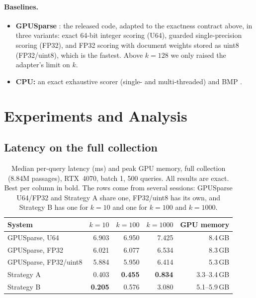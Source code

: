 \documentclass[11pt]{article}
\begin{document}
\paragraph{Baselines.}
\begin{itemize}
\item \textbf{GPUSparse} \cite{gpusparse}: the released code, adapted to the exactness contract above,
  in three variants: exact 64-bit integer scoring (U64), guarded single-precision scoring (FP32), and FP32 scoring
  with document weights stored as uint8 (FP32/uint8), which is the fastest. Above $k=128$ we only raised the
  adapter's limit on $k$.
\item \textbf{CPU:} an exact exhaustive scorer (single- and multi-threaded) and BMP \cite{bmp}.
\end{itemize}

\section{Experiments and Analysis}

\subsection{Latency on the full collection}
\begin{table}[H]
\centering
\caption{Median per-query latency (ms) and peak GPU memory, full collection (8.84M passages),
RTX~4070, batch 1, 500 queries. All results are exact. Best per column in bold. The rows come from several
sessions: GPUSparse U64/FP32 and Strategy A share one, FP32/uint8 has its own, and Strategy B has one for
$k=10$ and one for $k=100$ and $k=1000$.}
\label{tab:main}
\begin{tabular}{lrrrr}
\toprule
System & $k=10$ & $k=100$ & $k=1000$ & GPU memory\\
\midrule
GPUSparse, U64 & 6.903 & 6.950 & 7.425 & 8.4\,GB\\
GPUSparse, FP32 & 6.021 & 6.077 & 6.534 & 8.3\,GB\\
GPUSparse, FP32/uint8 & 5.884 & 5.950 & 6.414 & 5.3\,GB\\
\midrule
Strategy A & 0.403 & \textbf{0.455} & \textbf{0.834} & 3.3--3.4\,GB\\
Strategy B & \textbf{0.205} & 0.576 & 3.080 & 5.1--5.9\,GB\\
\bottomrule
\end{tabular}
\end{table}
\end{document}
